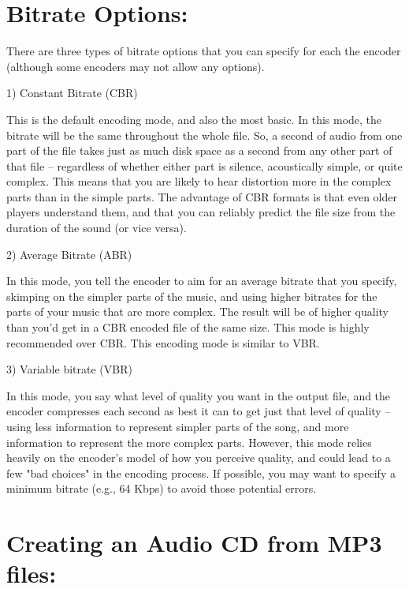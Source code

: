 \section{Bitrate Options:}

There are three types of bitrate options that you can specify for each
the encoder (although some encoders may not allow any options).

1) Constant Bitrate (CBR)

This is the default encoding mode, and also the most basic. In this mode, the 
bitrate will be the same throughout the whole file.  So, a second of audio from
one part of the file takes just as much disk space as a second from any other
part of that file -- regardless of whether either part is silence, acoustically
simple, or quite complex.  This means that you are likely to hear distortion more
in the complex parts than in the simple parts.  The advantage of CBR formats
is that even older players understand them, and that you can reliably predict
the file size from the duration of the sound (or vice versa).


2) Average Bitrate (ABR)

In this mode, you tell the encoder to aim for an average bitrate
that you specify, skimping on the simpler parts of the music, and using
higher bitrates for the parts of your music that are more complex. The
result will be of higher quality than you'd get in a CBR encoded file of
the same size. This mode is highly recommended over CBR. This encoding
mode is similar to VBR.

3) Variable bitrate (VBR)

In this mode, you say what level of quality you want in the output file,
and the encoder compresses each second as best it can to get just that
level of quality -- using less information to represent simpler parts of
the song, and more information to represent the more complex parts.
However, this mode relies heavily on the encoder's model of how you
perceive quality, and could lead to a few "bad choices" in the encoding
process. If possible, you may want to specify a minimum bitrate (e.g.,
64 Kbps) to avoid those potential errors.


\section{Creating an Audio CD from MP3 files:}

